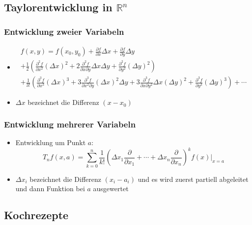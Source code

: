 \documentclass[a3paper, 11pt, landscape]{scrartcl}
\newcommand{\Rn}{\mathbb{R}^n}
\begin{document}
\begin{multicols*}{3}
	\subsection{Taylorentwicklung in $\Rn$}
	\subsubsection{Entwicklung zweier Variabeln}
	\begin{itemize}
	    \item $$\begin{aligned}
f(x, y)=f\left(x_{0}, y_{0}\right) +\frac{\partial f}{\partial x} \Delta x+\frac{\partial f}{\partial y} \Delta y \\
+\frac{1}{2}\left(\frac{\partial^{2} f}{\partial x^{2}}(\Delta x)^{2}+2 \frac{\partial^{2} f}{\partial x \partial y} \Delta x \Delta y+\frac{\partial^{2} f}{\partial y^{2}}(\Delta y)^{2}\right) \\
+\frac{1}{3 !}\left(\frac{\partial^{3} f}{\partial x^{3}}(\Delta x)^{3}+3 \frac{\partial^{3} f}{\partial x^{2} \partial y}(\Delta x)^{2} \Delta y+3 \frac{\partial^{3} f}{\partial x \partial y^{2}} \Delta x(\Delta y)^{2}+\frac{\partial^{3} f}{\partial y^{3}}(\Delta y)^{3}\right)+\cdots
\end{aligned}$$
    \item $\Delta x$ bezeichnet die Differenz $(x-x_0)$
	\end{itemize}
	
	\subsubsection{Entwicklung mehrerer Variabeln}
	\begin{itemize}
	    \item Entwicklung um Punkt $a$: $$T_nf(x, a)=\sum_{k=0}^{n} \frac{1}{k!}\left(\Delta x_1 \frac{\partial}{\partial x_1}+\cdots+\Delta x_n \frac{\partial}{\partial x_n}\right)^kf(x)\Bigg|_{x=a}$$
	    \item $\Delta x_i$ bezeichnet die Differenz $(x_i-a_i)$ und es wird zuerst partiell abgeleitet und dann Funktion bei $a$ ausgewertet
	\end{itemize}
	
	\subsection{Kochrezepte}

\end{multicols*}
\end{document}
